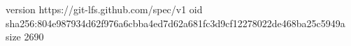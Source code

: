 version https://git-lfs.github.com/spec/v1
oid sha256:804e987934d62f976a6cbba4ed7d62a681fc3d9cf12278022de468ba25c5949a
size 2690
